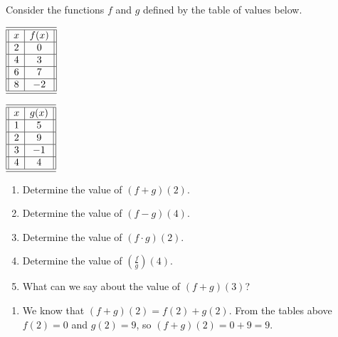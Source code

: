 \documentclass{ximera}
\begin{document}
	\begin{example}
		Consider the functions $f$ and $g$ defined by the table of values below. \\
		\begin{minipage}{.5\textwidth}
		  	\begin{center}
				$\begin{array}{||c|c||}
					\hline 
					\hline
					x & f(x)\\
					\hline
					2&0\\
					\hline
					4&3\\
					\hline
					6&7\\
					\hline
					8& -2\\
					\hline 
					\hline
				\end{array}$
			\end{center}
		\end{minipage}%
		\begin{minipage}{.5\textwidth}
		  	\begin{center}
				$\begin{array}{||c|c||}
					\hline 
					\hline
					x & g(x)\\
					\hline
					1&5\\
					\hline
					2&9\\
					\hline
					3&-1\\
					\hline
					4& 4\\
					\hline 
					\hline
				\end{array}$
			\end{center}
		\end{minipage}
		\begin{enumerate}
			\item Determine the value of $(f+g)(2)$.\\
			\item Determine the value of $(f-g)(4)$.\\
			\item Determine the value of $(f \cdot g)(2)$.\\
			\item Determine the value of  $\left( \frac{f}{g} \right)(4)$.\\
			\item What can we say about the value of $(f+g)(3)$?\\
		\end{enumerate}
		\begin{explanation}
			\begin{enumerate}
				\item We know that $(f+g)(2) = f(2)+g(2)$. From the tables above $f(2) = 0$ and $g(2)=9$, so $(f+g)(2)=0+9 = 9$.
				

\end{enumerate}
\end{explanation}
\end{example}
\end{document}
